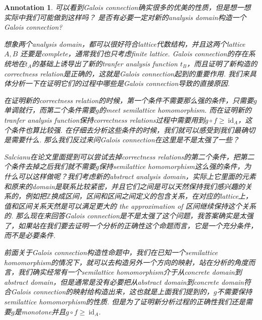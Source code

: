 \documentclass{article}
\newtheorem{annotation}[theorem]{Annotation}
\begin{document}
\begin{annotation}
\rm 可以看到Galois connection确实很多的优美的性质，但是想一想实际中我们可能做到这样吗？ 是否有必要一定对新的analysis domain构造一个Galois connection?

想象两个analysis domain，都可以很好符合lattice代数结构，并且这两个lattice $A,B$ 还要是complete，通常我们也只考虑finite lattice. Galois connection的存在系统地在$t_A$的基础上诱导出了新的tranfer analysis function $t_B$，而且证明了新构造的correctness relation是正确的，这就是Galois connection起到的重要作用. 我们来具体分析一下在证明它们的过程中哪些是Galois connection导致的直接原因. 

在证明新的correctness relation的时候，第一个条件不需要那么强的条件，只需要$g$单调就行，而第二个条件需要$g$的meet semilattice homomorphism. 而在证明新的tranfer analysis function保持correctness relations过程中需要用到$g \circ f \geq~\text{id}_A$，这个条件也算比较强. 在仔细去分析这些条件的时候，我们就可以感受到我们最确切是需要什么. 那么我们反过来问Galois connection在这里是不是太强了一些？

Salcianu在论文里面提到可以尝试去掉correctness relations的第二个条件，把第二个条件去掉之后我们就不需要$g$保持semilattice homomorphism这么强的条件，为什么可以这样做呢？我们考虑新的abstract analysis domain，实际上它里面的元素和原来的domain是联系比较紧密，并且它们之间是可以天然保持我们感兴趣的关系的，例如把$\mathbb{Z}$换成区间，区间和区间之间定义的包含关系，在对应的lattice上，值和区间关系天然是可以满足更大的 the approximation of 区间继续保持这个关系的. 那么现在来回答Galois connection是不是太强了这个问题，我答案确实是太强了，如果站在我们要去证明一个分析的正确性这个命题而言，它是一个充分条件，而不是必要条件.

前面关于Galois connection构造性命题中，我们在已知一个semilattice homomorphism的情况下，就可以去构造另外一个方向的映射，站在分析的角度而言，我们确实经常有一个semilattice homomorphism介于从concrete domain到abstract domain，但是通常是没有必要把从abstract domain到concrete domain符合Galois connection的映射给构造出来，这也就是上面我们提到的，$g$不需要保持semilattice homomorphism的性质. 但是为了证明新分析过程的正确性我们还是需要$g$是monotone并且$g\circ f \geq ~ \text{id}_A$.
\end{annotation}
\end{document}
